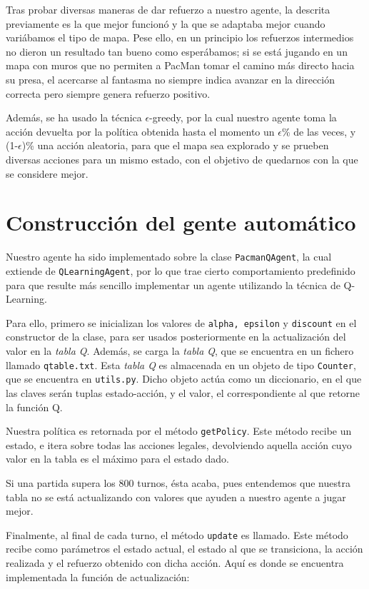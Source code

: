 \documentclass[12pt]{article}
\begin{document}
Tras probar diversas maneras de dar refuerzo a nuestro agente, la descrita previamente es la que mejor funcionó y la que se adaptaba mejor cuando variábamos el tipo de mapa. Pese ello, en un principio los refuerzos intermedios no dieron un resultado tan bueno como esperábamos; si se está jugando en un mapa con muros que no permiten a PacMan tomar el camino más directo hacia su presa, el acercarse al fantasma no siempre indica avanzar en la dirección correcta pero siempre genera refuerzo positivo.

Además, se ha usado la técnica $\epsilon$-greedy, por la cual nuestro agente toma la acción devuelta por la política obtenida hasta el momento un $\epsilon$\% de las veces, y (1-$\epsilon$)\% una acción aleatoria, para que el mapa sea explorado y se prueben diversas acciones para un mismo estado, con el objetivo de quedarnos con la que se considere mejor.

\section{Construcción del gente automático}

Nuestro agente ha sido implementado sobre la clase \texttt{PacmanQAgent}, la cual extiende de \texttt{QLearningAgent}, por lo que trae cierto comportamiento predefinido para que resulte más sencillo implementar un agente utilizando la técnica de Q-Learning.

Para ello, primero se inicializan los valores de \texttt{alpha, epsilon} y \texttt{discount} en el constructor de la clase, para ser usados posteriormente en la actualización del valor en la \textit{tabla Q}. Además, se carga la \textit{tabla Q}, que se encuentra en un fichero llamado \texttt{qtable.txt}. Esta \textit{tabla Q} es almacenada en un objeto de tipo \texttt{Counter}, que se encuentra en \texttt{utils.py}. Dicho objeto actúa como un diccionario, en el que las claves serán tuplas estado-acción, y el valor, el correspondiente al que retorne la función Q.

Nuestra política es retornada por el método \texttt{getPolicy}. Este método recibe un estado, e itera sobre todas las acciones legales, devolviendo aquella acción cuyo valor en la tabla es el máximo para el estado dado.

Si una partida supera los 800 turnos, ésta acaba, pues entendemos que nuestra tabla no se está actualizando con valores que ayuden a nuestro agente a jugar mejor.

Finalmente, al final de cada turno, el método \texttt{update} es llamado. Este método recibe como parámetros el estado actual, el estado al que se transiciona, la acción realizada y el refuerzo obtenido con dicha acción. Aquí es donde se encuentra implementada la función de actualización:
\end{document}
